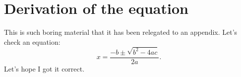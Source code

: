 \chapter{Derivation of the equation}

This is such boring material that it has been relegated to an appendix. Let's check an equation:
\begin{equation}
x = \frac{-b \pm \sqrt{b^2 - 4ac}}{2a} .
\label{quadratic soln}
\end{equation}
Let's hope I got it correct.
